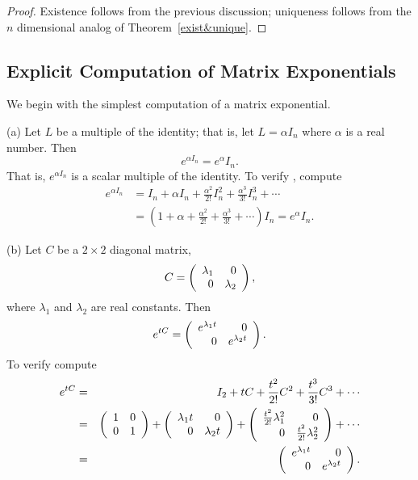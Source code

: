 \documentclass{ximera}
\begin{document}
\begin{proof}  Existence follows from the previous discussion;
uniqueness follows from the $n$ dimensional analog of
Theorem~\ref{exist&unique}.  \end{proof}


\subsection*{Explicit Computation of Matrix Exponentials}

We begin with the simplest computation of a matrix exponential.

\noindent (a) \quad Let $L$ be a multiple of the identity; that
is, let $L = \alpha I_n$ where $\alpha$ is a real number.  Then
\begin{equation} \label{ex:expm}
e^{\alpha I_n} = e^{\alpha} I_n.
\end{equation}
That is, $e^{\alpha I_n}$ is a scalar multiple of the
identity.  To verify , compute
\begin{align*}
e^{\alpha I_n} &= I_n + \alpha I_n + \frac{\alpha^2}{2!} I_n^2 +
                 \frac{\alpha^3}{3!} I_n^3 +\cdots \\
  &= (1+\alpha+\frac{\alpha^2}{2!}
+\frac{\alpha^3}{3!}+\cdots)I_n = e^{\alpha} I_n.
\end{align*}

\noindent (b) \quad Let $C$ be a $2\times 2$ diagonal matrix,
     \[
          C = \left(\begin{array}{rr} \lambda_1 & 0\\ 0 &\lambda_2\end{array}\right),
     \]
where $\lambda_1$ and $\lambda_2$ are real constants.  Then
\begin{equation}  \label{e:expdiag}
e^{tC} = \left(\begin{array}{rr} e^{\lambda_1 t} & 0\\ 0 &e^{\lambda_2 t}\end{array}\right).
\end{equation}
To verify  compute
\begin{eqnarray*}
   e^{tC} & = & I_2 + tC + \frac{t^2}{2!} C^2 +  \frac{t^3}{3!} C^3 +\cdots\\
        & = & \left(\begin{array}{rr} 1 & 0\\ 0 &1\end{array}\right) + \left(\begin{array}{rr} \lambda_1 t & 0\\ 0 &\lambda_2 t\end{array}\right) +
\left(\begin{array}{rr} \frac{t^2}{2!}\lambda_1^2 & 0\\ 0 &\frac{t^2}{2!}\lambda_2^2\end{array}\right) +\cdots\\
        & = & \left(\begin{array}{rr} e^{\lambda_1 t} & 0\\ 0 &e^{\lambda_2 t}\end{array}\right).
\end{eqnarray*}
\end{document}
